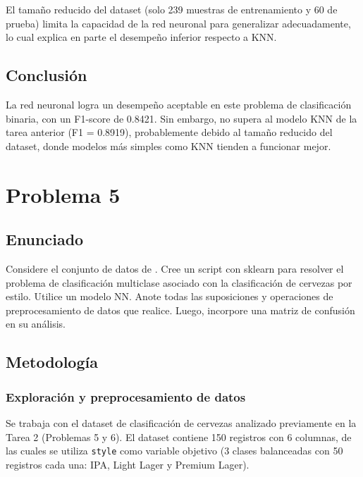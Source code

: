 \documentclass{article}
\begin{document}
El tamaño reducido del dataset (solo 239 muestras de entrenamiento y 60 de prueba) limita la capacidad de la red neuronal para generalizar adecuadamente, lo cual explica en parte el desempeño inferior respecto a KNN.

\subsection{Conclusión}

La red neuronal logra un desempeño aceptable en este problema de clasificación binaria, con un F1-score de 0.8421. Sin embargo, no supera al modelo KNN de la tarea anterior (F1 = 0.8919), probablemente debido al tamaño reducido del dataset, donde modelos más simples como KNN tienden a funcionar mejor.

\section{Problema 5}

\subsection{Enunciado}

Considere el conjunto de datos de \cite{KaggleAnkursBeerData}. Cree un script con sklearn para resolver el problema de clasificación multiclase asociado con la clasificación de cervezas por estilo. Utilice un modelo NN. Anote todas las suposiciones y operaciones de preprocesamiento de datos que realice. Luego, incorpore una matriz de confusión en su análisis.

\subsection{Metodología}

\subsubsection{Exploración y preprocesamiento de datos}

Se trabaja con el dataset de clasificación de cervezas analizado previamente en la Tarea 2 (Problemas 5 y 6). El dataset contiene 150 registros con 6 columnas, de las cuales se utiliza \texttt{style} como variable objetivo (3 clases balanceadas con 50 registros cada una: IPA, Light Lager y Premium Lager).
\end{document}
